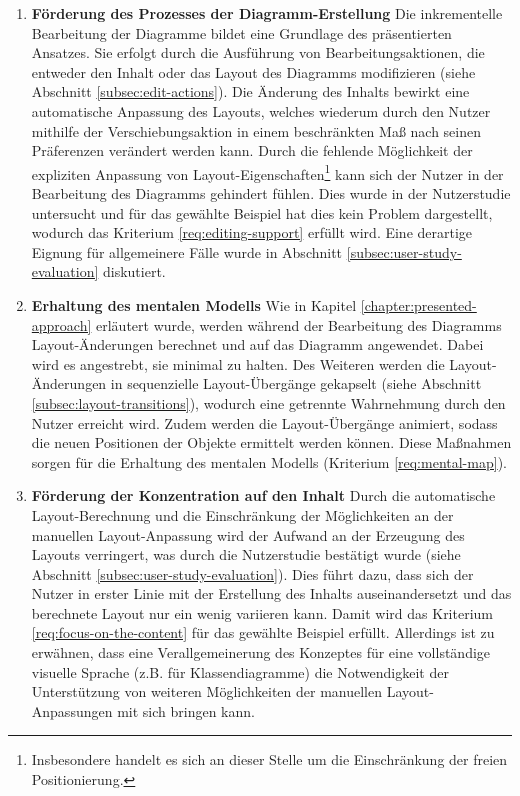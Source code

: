 \begin{enumerate}[label={K.\arabic*}]
\item
\label{eval:editing-support}
\textbf{Förderung des Prozesses der Diagramm-Erstellung}
Die inkrementelle Bearbeitung der Diagramme bildet eine Grundlage des präsentierten Ansatzes. Sie erfolgt durch die Ausführung von Bearbeitungsaktionen, die entweder den Inhalt oder das Layout des Diagramms modifizieren (siehe Abschnitt \ref{subsec:edit-actions}). Die Änderung des Inhalts bewirkt eine automatische Anpassung des Layouts, welches wiederum durch den Nutzer mithilfe der Verschiebungsaktion in einem beschränkten Maß nach seinen Präferenzen verändert werden kann. Durch die fehlende Möglichkeit der expliziten Anpassung von Layout-Eigenschaften\footnote{Insbesondere handelt es sich an dieser Stelle um die Einschränkung der freien Positionierung.} kann sich der Nutzer in der Bearbeitung des Diagramms gehindert fühlen. Dies wurde in der Nutzerstudie untersucht und für das gewählte Beispiel hat dies kein Problem dargestellt, wodurch das Kriterium \ref{req:editing-support} erfüllt wird. Eine derartige Eignung für allgemeinere Fälle wurde in Abschnitt \ref{subsec:user-study-evaluation} diskutiert.

\item
\label{eval:mental-map}
\textbf{Erhaltung des mentalen Modells}
Wie in Kapitel \ref{chapter:presented-approach} erläutert wurde, werden während der Bearbeitung des Diagramms Layout-Änderungen berechnet und auf das Diagramm angewendet. Dabei wird es angestrebt, sie minimal zu halten. Des Weiteren werden die Layout-Änderungen in sequenzielle Layout-Übergänge gekapselt (siehe Abschnitt \ref{subsec:layout-transitions}), wodurch eine getrennte Wahrnehmung durch den Nutzer erreicht wird. Zudem werden die Layout-Übergänge animiert, sodass die neuen Positionen der Objekte ermittelt werden können. Diese Maßnahmen sorgen für die Erhaltung des mentalen Modells (Kriterium \ref{req:mental-map}).

\item
\label{eval:focus-on-the-content}
\textbf{Förderung der Konzentration auf den Inhalt}
Durch die automatische Layout-Be\-rech\-nung und die Einschränkung der Möglichkeiten an der manuellen Layout-Anpassung wird der Aufwand an der Erzeugung des Layouts verringert, was durch die Nutzerstudie bestätigt wurde (siehe Abschnitt \ref{subsec:user-study-evaluation}). Dies führt dazu, dass sich der Nutzer in erster Linie mit der Erstellung des Inhalts auseinandersetzt und das berechnete Layout nur ein wenig variieren kann. Damit wird das Kriterium \ref{req:focus-on-the-content} für das gewählte Beispiel erfüllt. Allerdings ist zu erwähnen, dass eine Verallgemeinerung des Konzeptes für eine vollständige visuelle Sprache (z.B. für Klassendiagramme) die Notwendigkeit der Unterstützung von weiteren Möglichkeiten der manuellen Layout-Anpassungen mit sich bringen kann.


\end{enumerate}
